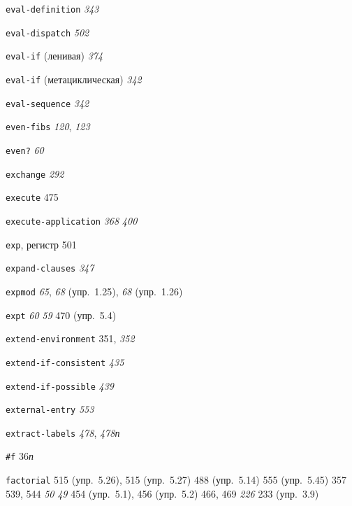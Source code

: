 \begin{theindex}
\item {\texttt{eval-definition}} {\it 343}
\item {\texttt{eval-dispatch}} {\it 502}
\item {\texttt{eval-if} (ленивая)} {\it 374}
\item {\texttt{eval-if} (метациклическая)} {\it 342}
\item {\texttt{eval-sequence}} {\it 342}
\item {\texttt{even-fibs}} {\it 120}, {\it 123}
\item {\texttt{even?}} {\it 60}
\item {\texttt{exchange}} {\it 292}
\item {\texttt{execute}} 475
\item {\texttt{execute-application}}
   {\it 368}
   {\it 400}
\item {\texttt{exp}, регистр} 501
\item {\texttt{expand-clauses}} {\it 347}
\item {\texttt{expmod}} {\it 65}, {\it 68} (упр.~1.25), {\it 68} (упр.~1.26)
\item {\texttt{expt}}
   {\it 60}
   {\it 59}
   470 (упр.~5.4)
\item {\texttt{extend-environment}} 351, {\it 352}
\item {\texttt{extend-if-consistent}} {\it 435}
\item {\texttt{extend-if-possible}} {\it 439}
\item {\texttt{external-entry}} {\it 553}
\item {\texttt{extract-labels}} {\it 478}, {\it 478}{\it п}
\bigskip
\item {\texttt{\#f}} 36{\it п}
\item {\texttt{factorial}}
   515 (упр.~5.26), 515 (упр.~5.27)
   488 (упр.~5.14)
   555 (упр.~5.45)
   357
   539, 544
   {\it 50}
   {\it 49}
   454 (упр.~5.1), 456 (упр.~5.2)
   466, 469
   {\it 226}
   233 (упр.~3.9)

\end{theindex}
